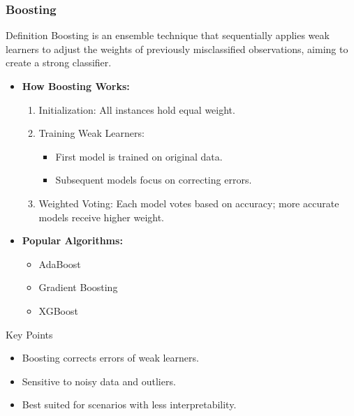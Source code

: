 \documentclass[aspectratio=169]{beamer}
\begin{document}
\begin{frame}[fragile]
    \frametitle{Boosting}
    \begin{block}{Definition}
        Boosting is an ensemble technique that sequentially applies weak learners to adjust the weights of previously misclassified observations, aiming to create a strong classifier.
    \end{block}

    \begin{itemize}
        \item \textbf{How Boosting Works:}
            \begin{enumerate}
                \item Initialization: All instances hold equal weight.
                \item Training Weak Learners:
                    \begin{itemize}
                        \item First model is trained on original data.
                        \item Subsequent models focus on correcting errors.
                    \end{itemize}
                \item Weighted Voting: Each model votes based on accuracy; more accurate models receive higher weight.
            \end{enumerate}
        \item \textbf{Popular Algorithms:}
            \begin{itemize}
                \item AdaBoost
                \item Gradient Boosting
                \item XGBoost
            \end{itemize}
    \end{itemize}

    \begin{block}{Key Points}
        \begin{itemize}
            \item Boosting corrects errors of weak learners.
            \item Sensitive to noisy data and outliers.
            \item Best suited for scenarios with less interpretability.
        \end{itemize}
    \end{block}
\end{frame}
\end{document}
